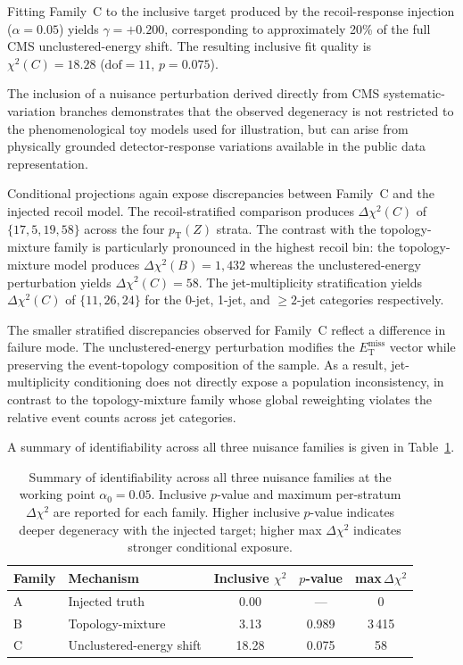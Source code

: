 \documentclass[a4paper,11pt]{article}
\newcommand{\MET}{\ensuremath{E_{\mathrm{T}}^{\mathrm{miss}}}\xspace}
\newcommand{\pTZ}{\ensuremath{p_{\mathrm{T}}(Z)}\xspace}
\begin{document}
Fitting Family~C to the inclusive target produced by the recoil-response
injection ($\alpha = 0.05$) yields $\gamma = +0.200$, corresponding to
approximately 20\% of the full CMS unclustered-energy shift.
The resulting inclusive fit quality is $\chi^2(C) = 18.28$
($\mathrm{dof} = 11$, $p = 0.075$).

The inclusion of a nuisance perturbation derived directly from CMS
systematic-variation branches demonstrates that the observed degeneracy is
not restricted to the phenomenological toy models used for illustration,
but can arise from physically grounded detector-response variations
available in the public data representation.

Conditional projections again expose discrepancies between Family~C and the
injected recoil model.
The recoil-stratified comparison produces $\Delta\chi^2(C)$ of
$\{17, 5, 19, 58\}$ across the four \pTZ strata.
The contrast with the topology-mixture family is particularly pronounced in
the highest recoil bin: the topology-mixture model produces
$\Delta\chi^2(B) = 1{,}432$ whereas the unclustered-energy perturbation
yields $\Delta\chi^2(C) = 58$.
The jet-multiplicity stratification yields $\Delta\chi^2(C)$ of
$\{11, 26, 24\}$ for the 0-jet, 1-jet, and $\geq\!2$-jet categories
respectively.

The smaller stratified discrepancies observed for Family~C reflect a
difference in failure mode.
The unclustered-energy perturbation modifies the \MET vector while
preserving the event-topology composition of the sample.
As a result, jet-multiplicity conditioning does not directly expose a
population inconsistency, in contrast to the topology-mixture family whose
global reweighting violates the relative event counts across jet categories.

A summary of identifiability across all three nuisance families is given in
Table~\ref{tab:summary}.

\begin{table}[H]
  \centering
  \caption{Summary of identifiability across all three nuisance families
    at the working point $\alpha_0 = 0.05$.
    Inclusive $p$-value and maximum per-stratum $\Delta\chi^2$ are reported
    for each family.
    Higher inclusive $p$-value indicates deeper degeneracy with the
    injected target; higher max $\Delta\chi^2$ indicates stronger
    conditional exposure.}
  \label{tab:summary}
  \begin{tabular}{llccc}
    \toprule
    Family & Mechanism & Inclusive $\chi^2$ & $p$-value & max\,$\Delta\chi^2$ \\
    \midrule
    A & Injected truth           &  0.00 & ---   & 0 \\
    B & Topology-mixture         &  3.13 & 0.989 & 3\,415 \\
    C & Unclustered-energy shift & 18.28 & 0.075 & 58 \\
    \bottomrule
  \end{tabular}
\end{table}
\end{document}
